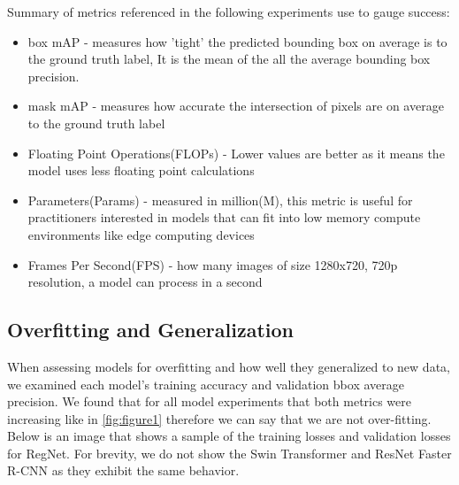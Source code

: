\documentclass[10pt,twocolumn,letterpaper]{article}
\begin{document}
Summary of metrics referenced in the following experiments use to gauge success:

\begin{itemize}
\setlength\itemsep{0pt}
    \item box mAP - measures how 'tight' the predicted bounding box on average is to the ground truth label, It is the mean of the all the average bounding box precision. 
    \item mask mAP - measures how accurate the intersection of pixels are on average to the ground truth label
    \item Floating Point Operations(FLOPs) - Lower values are better as it means the model uses less floating point calculations
    \item Parameters(Params) - measured in million(M), this metric is useful for practitioners interested in models that can fit into low memory compute environments like edge computing devices
    \item Frames Per Second(FPS) - how many images of size 1280x720, 720p resolution, a model can process in a second
\end{itemize}



\subsection{Overfitting and Generalization} \label{overfittingGeneralization}


When assessing models for overfitting and how well they generalized to new data, we examined each model's training accuracy and validation bbox average precision. We found that for all model experiments that both metrics were increasing like in \autoref{fig:figure1} therefore we can say that we are not over-fitting. Below is an image that shows a sample of the training losses and validation losses for RegNet. For brevity, we do not show the Swin Transformer and ResNet Faster R-CNN as they exhibit the same behavior.
\end{document}
